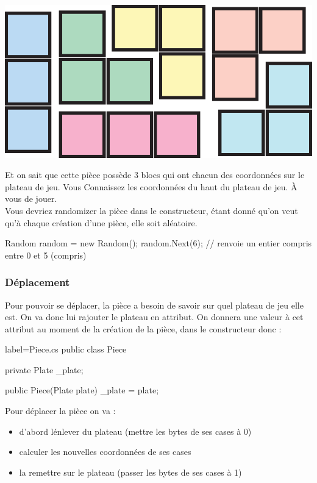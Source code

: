 \documentclass[a4paper]{article}
\begin{document}
    \begin{center}
        \includegraphics[scale=0.5]{img/pieces.eps}
    \end{center}
\endgroup

Et on sait que cette pièce possède 3 blocs qui ont chacun des coordonnées sur
le plateau de jeu. Vous Connaissez les coordonnées du haut du plateau de jeu.
À vous de jouer. \\

Vous devriez randomizer la pièce dans le constructeur, étant donné qu'on veut
qu'à chaque création d'une pièce, elle soit aléatoire. \\

\begin{csharpcode}
Random random = new Random();
random.Next(6); // renvoie un entier compris entre 0 et 5 (compris)
\end{csharpcode}

\subsubsection{Déplacement}

Pour pouvoir se déplacer, la pièce a besoin de savoir sur quel plateau de jeu
elle est. On va donc lui rajouter le plateau en attribut. On donnera une valeur
à cet attribut au moment de la création de la pièce, dans le constructeur donc : \\

\begin{csharpcode*}{label=Piece.cs}
public class Piece
{
    private Plate _plate;

    public Piece(Plate plate)
    {
        _plate = plate;
    }
}
\end{csharpcode*}

Pour déplacer la pièce on va :
\begin{itemize}
    \item d'abord lénlever du plateau (mettre les bytes de ses cases à 0)
    \item calculer les nouvelles coordonnées de ses cases
    \item la remettre sur le plateau (passer les bytes de ses cases à 1)
\end{itemize}
\end{document}
